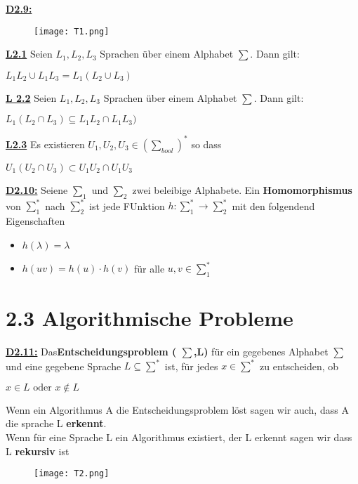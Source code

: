 \documentclass[8pt]{extreport}
\begin{document}
\underline{\textbf{D2.9:}} 
\begin{figure}[H]
\centering
\texttt{[image: T1.png]}
\end{figure}

\underline{\textbf{L2.1}} Seien $L_1,L_2,L_3$ Sprachen über einem Alphabet $\sum$. Dann gilt:
\begin{center}
$L_1L_2 \cup L_1L_3 = L_1(L_2 \cup L_3)$
\end{center}
\underline{\textbf{L 2.2}} Seien $L_1,L_2,L_3$ Sprachen über einem Alphabet $\sum$. Dann gilt:
\begin{center}
$L_1(L_2 \cap L_3) \subseteq L_1L_2 \cap L_1L_3)$
\end{center}

\underline{\textbf{L2.3}} Es existieren $U_1,U_2,U_3 \in (\sum_{bool})^*$ so dass
\begin{center}
$U_1(U_2 \cap U_3) \subset U_1U_2 \cap U_1U_3$
\end{center}

\underline{\textbf{D2.10:}} Seiene $\sum_1$ und $\sum_2$ zwei beleibige Alphabete. Ein \textbf{Homomorphismus} von $\sum_1^*$ nach $\sum_2^*$ ist jede FUnktion $h: \sum_1^* \rightarrow \sum_2^*$ mit den folgendend Eigenschaften
\begin{itemize}
\item $h(\lambda) = \lambda$
\item $h(uv) = h(u) \cdot h(v)$ für alle $u,v \in \sum_1^*$
\end{itemize}

\section{2.3 Algorithmische Probleme}

\underline{\textbf{D2.11:}} Das\textbf{Entscheidungsproblem ( $\sum$,L)} für ein gegebenes Alphabet $\sum$ und eine gegebene Sprache $L \subseteq \sum^*$ ist, für jedes $x \in \sum^*$ zu entscheiden, ob
\begin{center}
$x \in L \text{ oder } x \notin L$
\end{center}
Wenn ein Algorithmus A die Entscheidungsproblem löst sagen wir auch, dass A die sprache L \textbf{erkennt}.\\
Wenn für eine Sprache L ein Algorithmus existiert, der L erkennt sagen wir dass L \textbf{rekursiv} ist
\begin{figure}[H]
\centering
\texttt{[image: T2.png]}
\end{figure}
\end{document}

